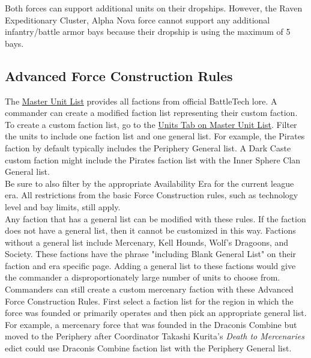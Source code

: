 \documentclass{article}
\begin{document}
Both forces can support additional units on their dropships.
However, the Raven Expeditionary Cluster, Alpha Nova force cannot support any additional infantry/battle armor bays because their dropship is using the maximum of 5 bays.\\

\newpage

\subsection{Advanced Force Construction Rules}

The \href{http://www.masterunitlist.info/}{Master Unit List} provides all factions from official BattleTech lore.
A commander can create a modified faction list representing their custom faction.\\

To create a custom faction list, go to the \href{http://www.masterunitlist.info/Unit/Filter}{Units Tab on Master Unit List}.
Filter the units to include one faction list and one general list.
For example, the Pirates faction by default typically includes the Periphery General list.
A Dark Caste custom faction might include the Pirates faction list with the Inner Sphere Clan General list.\\

Be sure to also filter by the appropriate Availability Era for the current league era.
All restrictions from the basic Force Construction rules, such as technology level and bay limits, still apply.\\

Any faction that has a general list can be modified with these rules.
If the faction does not have a general list, then it cannot be customized in this way.
Factions without a general list include Mercenary, Kell Hounds, Wolf's Dragoons, and Society.
These factions have the phrase "including Blank General List" on their faction and era specific page.
Adding a general list to these factions would give the commander a disproportionately large number of units to choose from.\\

Commanders can still create a custom mercenary faction with these Advanced Force Construction Rules.
First select a faction list for the region in which the force was founded or primarily operates and then pick an appropriate general list.
For example, a mercenary force that was founded in the Draconis Combine but moved to the Periphery after Coordinator Takashi Kurita's \emph{Death to Mercenaries} edict could use Draconis Combine faction list with the Periphery General list.\\
\end{document}
